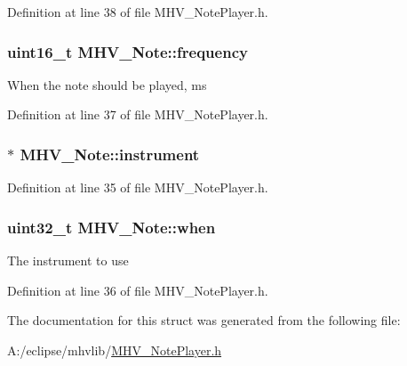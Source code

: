 \-Definition at line 38 of file \-M\-H\-V\-\_\-\-Note\-Player.\-h.

\hypertarget{struct_m_h_v___note_a24c7addceca4036405ee15ecb0a01c71}{
\subsubsection[{frequency}]{\setlength{\rightskip}{0pt plus 5cm}uint16\-\_\-t {\bf \-M\-H\-V\-\_\-\-Note\-::frequency}}}
\label{struct_m_h_v___note_a24c7addceca4036405ee15ecb0a01c71}
\-When the note should be played, ms 

\-Definition at line 37 of file \-M\-H\-V\-\_\-\-Note\-Player.\-h.

\hypertarget{struct_m_h_v___note_ae799998aafadeb322df99805a9c0d1bf}{
\subsubsection[{instrument}]{$\ast$ {\bf \-M\-H\-V\-\_\-\-Note\-::instrument}}}
\label{struct_m_h_v___note_ae799998aafadeb322df99805a9c0d1bf}


\-Definition at line 35 of file \-M\-H\-V\-\_\-\-Note\-Player.\-h.

\hypertarget{struct_m_h_v___note_a561bc0a1d803744be9908e23fed4a017}{
\subsubsection[{when}]{\setlength{\rightskip}{0pt plus 5cm}uint32\-\_\-t {\bf \-M\-H\-V\-\_\-\-Note\-::when}}}
\label{struct_m_h_v___note_a561bc0a1d803744be9908e23fed4a017}
\-The instrument to use 

\-Definition at line 36 of file \-M\-H\-V\-\_\-\-Note\-Player.\-h.



\-The documentation for this struct was generated from the following file\-:\begin{DoxyCompactItemize}
\item 
\-A\-:/eclipse/mhvlib/\hyperlink{_m_h_v___note_player_8h}{\-M\-H\-V\-\_\-\-Note\-Player.\-h}\end{DoxyCompactItemize}
